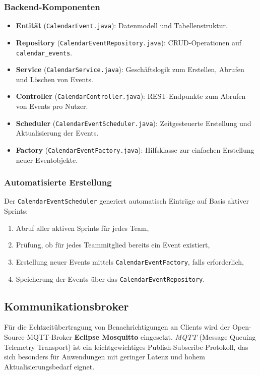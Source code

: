 \documentclass[12pt,a4paper]{report}
\begin{document}
    \subsubsection{Backend-Komponenten}
        \begin{itemize}
            \item \textbf{Entität} (\texttt{CalendarEvent.java}): Datenmodell und Tabellenstruktur.
            \item \textbf{Repository} (\texttt{CalendarEventRepository.java}): CRUD-Operationen auf \texttt{calendar\_events}.
            \item \textbf{Service} (\texttt{CalendarService.java}): Geschäftslogik zum Erstellen, Abrufen und Löschen von Events.
            \item \textbf{Controller} (\texttt{CalendarController.java}): REST-Endpunkte zum Abrufen von Events pro Nutzer.
            \item \textbf{Scheduler} (\texttt{CalendarEventScheduler.java}): Zeitgesteuerte Erstellung und Aktualisierung der Events.
            \item \textbf{Factory} (\texttt{CalendarEventFactory.java}): Hilfsklasse zur einfachen Erstellung neuer Eventobjekte.
        \end{itemize}

    \subsubsection{Automatisierte Erstellung}
        Der \texttt{CalendarEventScheduler} generiert automatisch Einträge auf Basis aktiver Sprints:
        \begin{enumerate}
            \item Abruf aller aktiven Sprints für jedes Team,
            \item Prüfung, ob für jedes Teammitglied bereits ein Event existiert,
            \item Erstellung neuer Events mittels \texttt{CalendarEventFactory}, falls erforderlich,
            \item Speicherung der Events über das \texttt{CalendarEventRepository}.
        \end{enumerate}

\subsection{Kommunikationsbroker}
        Für die Echtzeitübertragung von Benachrichtigungen an Clients wird der Open-Source-MQTT-Broker \textbf{Eclipse Mosquitto} eingesetzt.
        \textit{MQTT} (Message Queuing Telemetry Transport) ist ein leichtgewichtiges Publish-Subscribe-Protokoll, das sich besonders für Anwendungen mit geringer Latenz und hohem Aktualisierungsbedarf eignet.
\end{document}
